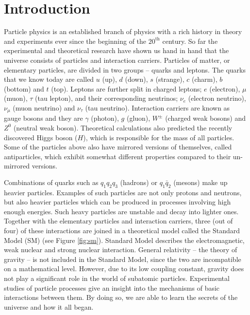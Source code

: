 \chapter{Introduction}
\pagestyle{plain}
Particle physics is an established branch of physics with a rich history in theory and experiments ever since the beginning of the $20^{\mathrm{th}}$ century. So far the experimental and theoretical research have shown us hand in hand that the universe consists of particles and interaction carriers. Particles of matter, or elementary particles, are divided in two groups -- quarks and leptons. The quarks that we know today are called $u$ (up), $d$ (down), $s$ (strange), $c$ (charm), $b$ (bottom) and $t$ (top). Leptons are further split in charged leptons; $e$ (electron), $\mu$ (muon), $\tau$ (tau lepton), and their corresponding neutrinos; $\nu_e$ (electron neutrino), $\nu_\mu$ (muon neutrino) and $\nu_\tau$ (tau neutrino). Interaction carriers are known as gauge bosons and they are $\gamma$ (photon), $g$ (gluon), $W^\pm$ (charged weak bosons) and $Z^0$ (neutral weak boson). Theoretical calculations also predicted the recently discovered Higgs boson ($H$), which is responsible for the mass of all particles. Some of the particles above also have mirrored versions of themselves, called antiparticles, which exhibit somewhat different properties compared to their un-mirrored versions.

Combinations of quarks such as $q_1 q_2 q_3$ (hadrons) or $q_1 \bar{q}_2$ (mesons) make up heavier particles. Examples of such particles are not only protons and neutrons, but also heavier particles which can be produced in processes involving high enough energies. Such heavy particles are unstable and decay into lighter ones. Together with the elementary particles and interaction carriers, three (out of four) of these interactions are joined in a theoretical model called the Standard Model (SM) \cite{GLASHOW1961579, PhysRevLett.19.1264, salam1994weak, GIMmech} (see Figure \ref{fig:sm}). Standard Model describes the electromagnetic, weak nuclear and strong nuclear interaction. General relativity -- the theory of gravity -- is not included in the Standard Model, since the two are incompatible on a mathematical level. However, due to its low coupling constant, gravity does not play a significant role in the world of subatomic particles. Experimental studies of particle processes give an insight into the mechanisms of basic interactions between them. By doing so, we are able to learn the secrets of the universe and how it all began.


